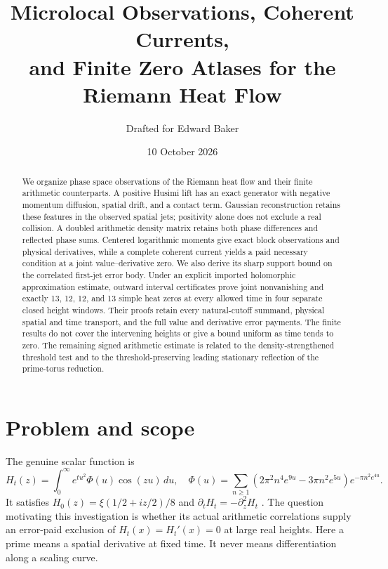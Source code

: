 \documentclass[11pt]{article}
\title{Microlocal Observations, Coherent Currents,\texorpdfstring{\\}{ }and Finite Zero Atlases for the Riemann Heat Flow}
\author{Drafted for Edward Baker}
\date{10 October 2026}
\numberwithin{equation}{section}
\theoremstyle{definition}
\theoremstyle{remark}
\newcommand{\dd}{\,d}
\begin{document}
\maketitle
\begin{abstract}
We organize phase space observations of the Riemann heat flow and their
finite arithmetic counterparts. A positive Husimi lift has an exact
generator with negative momentum diffusion, spatial drift, and a contact
term. Gaussian reconstruction retains these features in the observed
spatial jets; positivity alone does not exclude a real collision. A doubled
arithmetic density matrix retains both phase differences and reflected
phase sums. Centered logarithmic moments give exact block observations and
physical derivatives, while a complete coherent current yields a paid
necessary condition at a joint value--derivative zero. We also derive its
sharp support bound on the correlated first-jet error body. Under an
explicit imported holomorphic approximation estimate, outward interval
certificates prove joint nonvanishing and exactly 13, 12, 12, and 13 simple
heat zeros at every allowed time in four separate closed height windows.
Their proofs retain every natural-cutoff summand, physical spatial and
time transport, and the full value and derivative error payments. The
finite results do not cover the intervening heights or give a bound
uniform as time tends to zero. The remaining signed arithmetic estimate
is related to the density-strengthened threshold test and to the
threshold-preserving leading stationary reflection of the prime-torus reduction.
\end{abstract}
\tableofcontents

\section{Problem and scope}
The genuine scalar function is
\begin{equation}
 H_t(z)=\int_0^\infty e^{tu^2}\Phi(u)\cos(zu)\dd u,
 \quad
 \Phi(u)=\sum_{n\ge1}(2\pi^2n^4e^{9u}-3\pi n^2e^{5u})
                         e^{-\pi n^2e^{4u}}.
 \label{eq:heat}
\end{equation}
It satisfies $H_0(z)=\xi(1/2+iz/2)/8$ and
$\partial_tH_t=-\partial_z^2H_t$ \cite{polymath}.
The question motivating this investigation is whether its actual
arithmetic correlations supply an error-paid exclusion of
$H_t(x)=H_t'(x)=0$ at large real heights. Here a prime means a spatial
derivative at fixed time. It never means differentiation along a scaling
curve.
\end{document}
